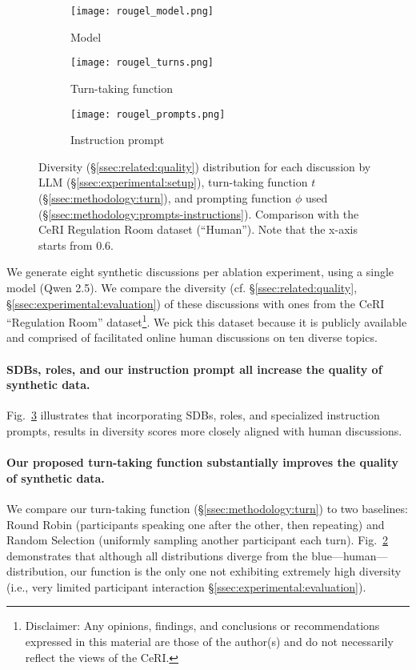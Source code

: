 \begin{figure*}[t]
	\begin{subfigure}{0.32\linewidth}
		\texttt{[image: rougel\_model.png]}
		\caption{Model}
		\label{fig:rougel_model}
	\end{subfigure}%
	\hfill
	\begin{subfigure}{0.32\linewidth}
		\texttt{[image: rougel\_turns.png]}
		\caption{Turn-taking function}
		\label{fig:rougel_turns}
	\end{subfigure}%
	\hfill
	\begin{subfigure}{0.32\linewidth}
		\texttt{[image: rougel\_prompts.png]}
		\caption{Instruction prompt}
		\label{fig:rougel_prompts}
	\end{subfigure}%
	
	\caption{Diversity (\S\ref{ssec:related:quality}) distribution for each discussion by LLM (\S\ref{ssec:experimental:setup}), turn-taking function $t$ (\S\ref{ssec:methodology:turn}), and prompting function $\phi$ used (\S\ref{ssec:methodology:prompts-instructions}). Comparison with the CeRI Regulation Room dataset (``Human''). Note that the x-axis starts from $0.6$.}
	\label{fig:diversity}
\end{figure*}

We generate eight synthetic discussions per ablation experiment, using a single model (Qwen 2.5). We compare the diversity (cf. \S\ref{ssec:related:quality}, \S\ref{ssec:experimental:evaluation}) of these discussions with ones from the CeRI “Regulation Room” dataset\footnote{Disclaimer: Any opinions, findings, and conclusions or recommendations expressed in this material are those of the author(s) and do not necessarily reflect the views of the CeRI.}. We pick this dataset because it is publicly available and comprised of facilitated online human discussions on ten diverse topics.

\paragraph{SDBs, roles, and our instruction prompt all increase the quality of synthetic data.} Fig.~\ref{fig:rougel_prompts} illustrates that incorporating SDBs, roles, and specialized instruction prompts, results in diversity scores more closely aligned with human discussions.

\paragraph{Our proposed turn-taking function substantially improves the quality of synthetic data.} We compare our turn-taking function (\S\ref{ssec:methodology:turn}) to two baselines: Round Robin (participants speaking one after the other, then repeating) and Random Selection (uniformly sampling another participant each turn). Fig.~\ref{fig:rougel_turns} demonstrates that although all distributions diverge from the blue—human—distribution, our function is the only one not exhibiting extremely high diversity (i.e., very limited participant interaction \S\ref{ssec:experimental:evaluation}).

